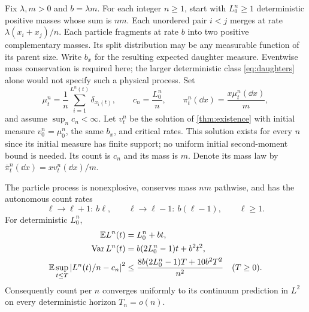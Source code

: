 Fix $\lambda,m>0$ and $b=\lambda m$. For each integer $n\geq1$, start with
$L_0^n\geq1$ deterministic positive masses whose sum is $nm$. Each unordered
pair $i<j$ merges at rate $\lambda(x_i+x_j)/n$. Each particle fragments at
rate $b$ into two positive complementary masses. Its split distribution may
be any measurable function of its parent size. Write $b_x$ for the resulting
expected daughter measure. Eventwise mass conservation is required here;
the larger deterministic class \eqref{eq:daughters} alone would not specify
such a physical process. Set
\begin{equation}
 \mu_t^n=\frac1n\sum_{i=1}^{L^n(t)}\delta_{x_i(t)},\qquad
 c_n=\frac{L_0^n}{n},\qquad
 \pi_t^n(\dd x)=\frac{x\mu_t^n(\dd x)}m,
 \label{eq:finite-measures}
\end{equation}
and assume $\sup_nc_n<\infty$.
Let $v_t^n$ be the solution of \cref{thm:existence} with initial measure
$v_0^n=\mu_0^n$, the same $b_x$, and critical rates. This solution exists for
every $n$ since its initial measure has finite support; no uniform initial
second-moment bound is needed. Its count is $c_n$ and its mass is $m$.
Denote its mass law by $\bar\pi_t^n(\dd x)=xv_t^n(\dd x)/m$.

\begin{proposition}\label{prop:finite-count}
The particle process is nonexplosive, conserves mass $nm$ pathwise, and
has the autonomous count rates
\begin{equation}
 \ell\longrightarrow\ell+1:\ b\ell,\qquad
 \ell\longrightarrow\ell-1:\ b(\ell-1),\qquad \ell\geq1.
 \label{eq:count-rates}
\end{equation}
For deterministic $L_0^n$,
\begin{align}
 \mathbb E L^n(t)&=L_0^n+bt,\notag\\
 \operatorname{Var} L^n(t)&=b(2L_0^n-1)t+b^2t^2,\label{eq:finite-count-moments}\\
 \mathbb E\sup_{t\leq T}\left|L^n(t)/n-c_n\right|^2
 &\leq\frac{8b(2L_0^n-1)T+10b^2T^2}{n^2}
 \quad(T\geq0).\label{eq:finite-count-concentration}
\end{align}
Consequently count per $n$ converges uniformly to its continuum prediction
in $L^2$ on every deterministic horizon $T_n=o(n)$.
\end{proposition}

